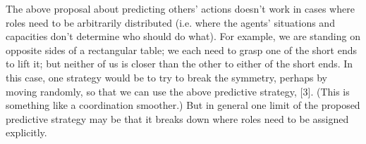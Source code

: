 \documentclass[12pt,\papersize]{extarticle}
\begin{document}
The above proposal about predicting others' actions doesn't work in cases where roles need to be arbitrarily distributed (i.e. where the agents' situations and capacities don't determine who should do what).  For example, we are standing on opposite sides of a rectangular table; we each need to grasp one of the short ends to lift it; but neither of us is closer than the other to either of the short ends.  In this case, one strategy would be to try to break the symmetry, perhaps by moving randomly, so that we can use the above predictive strategy, [3].  (This is something like a coordination smoother.)  But in general one limit of the proposed predictive strategy may be that it breaks down where roles need to be assigned explicitly.






\small

\end{document}
